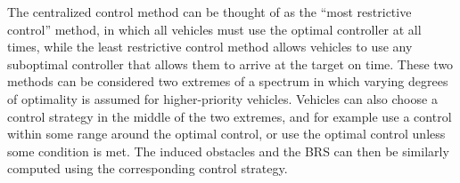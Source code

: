 \begin{remark}
The centralized control method can be thought of as the ``most restrictive control'' method, in which all vehicles must use the optimal controller at all times, while the least restrictive control method allows vehicles to use any suboptimal controller that allows them to arrive at the target on time. These two methods can be considered two extremes of a spectrum in which varying degrees of optimality is assumed for higher-priority vehicles. Vehicles can also choose a control strategy in the middle of the two extremes, and for example use a control within some range around the optimal control, or use the optimal control unless some condition is met. The induced obstacles and the BRS can then be similarly computed using the corresponding control strategy.
\end{remark}